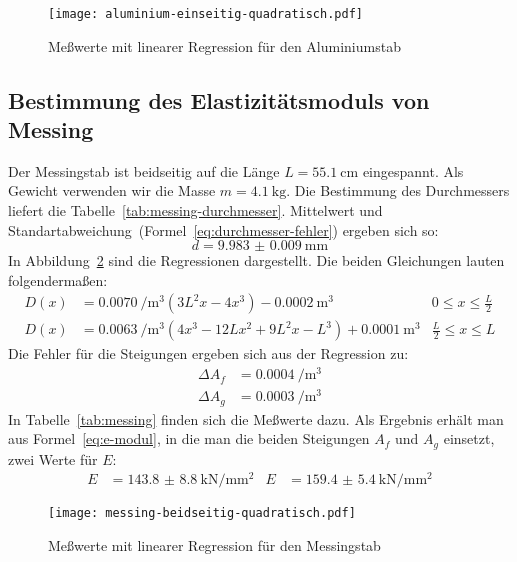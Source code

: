 \begin{figure}
  \centering
  \texttt{[image: aluminium-einseitig-quadratisch.pdf]}
  \caption{Meßwerte mit linearer Regression für den Aluminiumstab}
  \label{fig:aluminium}
\end{figure}


\subsection{Bestimmung des Elastizitätsmoduls von Messing}

Der Messingstab ist beidseitig auf die Länge $L =
\SI{55.1}{\centi\metre}$ eingespannt. Als Gewicht verwenden wir die
Masse $m = \SI{4.1}{\kilogram}$. Die Bestimmung des Durchmessers liefert
die Tabelle~\ref{tab:messing-durchmesser}. Mittelwert und
Standartabweichung~(Formel~\eqref{eq:durchmesser-fehler}) ergeben sich so:
%
\begin{equation}
  d = \SI{9.983(9)}{\milli\meter}
\end{equation}
%
In Abbildung~\ref{fig:messing} sind die Regressionen
dargestellt. Die beiden Gleichungen lauten folgendermaßen:
%
\begin{align}
  D(x) &= \SI{0.0070}{\per\cubic\metre} 
  ( 3L^2x-4x^3 ) - \SI{0.0002}{\cubic\metre} 
  & 0 \le x \le \frac{L}{2}\\
  D(x) &= \SI{0.0063}{\per\cubic\metre}
  (4x^3 - 12Lx^2 + 9L^2x - L^3) + \SI{0.0001}{\cubic\metre} 
  & \frac{L}{2} \le x \le L
\end{align}
%
Die Fehler für die Steigungen ergeben sich aus der Regression zu:
%
\begin{align}
  \Delta A_f &= \SI{0.0004}{\per\cubic\metre}\\
  \Delta A_g &= \SI{0.0003}{\per\cubic\metre}
\end{align}
%
In Tabelle~\ref{tab:messing} finden sich die Meßwerte dazu. Als
Ergebnis erhält man aus Formel~\eqref{eq:e-modul}, in die man die beiden
Steigungen $A_f$ und $A_g$ einsetzt, zwei Werte für $E$:
\begin{align}
 E&=\SI{143.8(88)}{\kilo\newton\per\milli\metre\squared} &
 E&=\SI{159.4(54)}{\kilo\newton\per\milli\metre\squared}
\end{align}

\begin{figure}
  \centering
  \texttt{[image: messing-beidseitig-quadratisch.pdf]}
  \caption{Meßwerte mit linearer Regression für den Messingstab}
  \label{fig:messing}
\end{figure}


